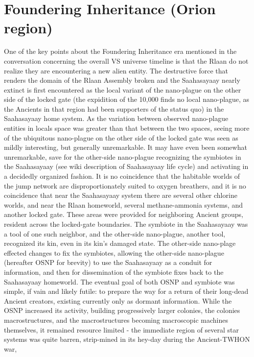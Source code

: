 \section{Foundering Inheritance (Orion region)}
One of the key points about the Foundering Inheritance era mentioned
in the conversation concerning the overall VS universe timeline is
that the Rlaan do not realize they are encountering a new alien
entity. The destructive force that renders the domain of the Rlaan
Assembly broken and the Saahasayaay nearly extinct is first
encountered as the local variant of the nano-plague on the other side
of the locked gate (the expidition of the 10,000 finds no local
nano-plague, as the Ancients in that region had been supporters of the
status quo) in the Saahasayaay home system. As the variation between
observed nano-plague entities in locals space was greater than that
between the two spaces, seeing more of the ubiquitous nano-plague on
the other side of the locked gate was seen as mildly interesting, but
generally unremarkable. It may have even been somewhat unremarkable,
save for the other-side nano-plague recognizing the symbiotes in the
Saahasayaay (see wiki description of Saahasayaay life cycle) and
activating in a decidedly organized fashion. It is no coincidence that
the habitable worlds of the jump network are disproportionately suited
to oxygen breathers, and it is no coincidence that near the
Saahasayaay system there are several other chlorine worlds, and near
the Rlaan homeworld, several methane-ammonia systems, and another
locked gate. These areas were provided for neighboring Ancient groups,
resident across the locked-gate boundaries. The symbiote in the
Saahasayaay was a tool of one such neighbor, and the other-side
nano-plague, another tool, recognized its kin, even in its kin's
damaged state. The other-side nano-plage effected changes to fix the
symbiotes, allowing the other-side nano-plague (hereafter OSNP for
brevity) to use the Saahasayaay as a conduit for information, and then
for dissemination of the symbiote fixes back to the Saahasayaay
homeworld. The eventual goal of both OSNP and symbiote was simple, if
vain and likely futile: to prepare the way for a return of their
long-dead Ancient creators, existing currently only as dormant
information. While the OSNP increased its activity, building
progressively larger colonies, the colonies macrostructures, and the
macrostructures becoming macroscopic machines themselves, it remained
resource limited - the immediate region of several star systems was
quite barren, strip-mined in its hey-day during the Ancient-TWHON war,
